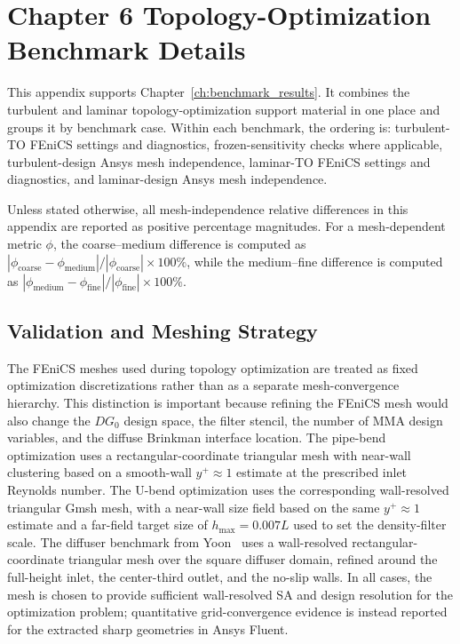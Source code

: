 \chapter{Chapter 6 Topology-Optimization Benchmark Details}
\label{app:C_topology_optimization_benchmarks}
\label{app:C_laminar_turbulent_topology_comparison}

This appendix supports Chapter~\ref{ch:benchmark_results}. It combines the turbulent and laminar topology-optimization support material in one place and groups it by benchmark case. Within each benchmark, the ordering is: turbulent-TO FEniCS settings and diagnostics, frozen-sensitivity checks where applicable, turbulent-design Ansys mesh independence, laminar-TO FEniCS settings and diagnostics, and laminar-design Ansys mesh independence.

Unless stated otherwise, all mesh-independence relative differences in this appendix are reported as positive percentage magnitudes. For a mesh-dependent metric $\phi$, the coarse--medium difference is computed as $|\phi_{\mathrm{coarse}}-\phi_{\mathrm{medium}}|/|\phi_{\mathrm{coarse}}|\times100\%$, while the medium--fine difference is computed as $|\phi_{\mathrm{medium}}-\phi_{\mathrm{fine}}|/|\phi_{\mathrm{fine}}|\times100\%$.

\section{Validation and Meshing Strategy}
\label{sec:app_B_mesh_strategy}
The FEniCS meshes used during topology optimization are treated as fixed optimization discretizations rather than as a separate mesh-convergence hierarchy. This distinction is important because refining the FEniCS mesh would also change the $DG_0$ design space, the filter stencil, the number of MMA design variables, and the diffuse Brinkman interface location. The pipe-bend optimization uses a rectangular-coordinate triangular mesh with near-wall clustering based on a smooth-wall $y^+\approx1$ estimate at the prescribed inlet Reynolds number. The U-bend optimization uses the corresponding wall-resolved triangular Gmsh mesh, with a near-wall size field based on the same $y^+\approx1$ estimate and a far-field target size of $h_{\max}=0.007L$ used to set the density-filter scale. The diffuser benchmark from Yoon~\cite{Yoon2016} uses a wall-resolved rectangular-coordinate triangular mesh over the square diffuser domain, refined around the full-height inlet, the center-third outlet, and the no-slip walls. In all cases, the mesh is chosen to provide sufficient wall-resolved SA and design resolution for the optimization problem; quantitative grid-convergence evidence is instead reported for the extracted sharp geometries in Ansys Fluent.

